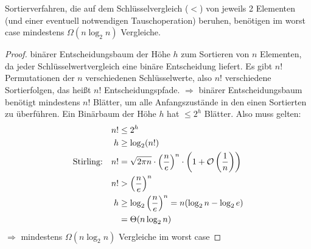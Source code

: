 \begin{proposition}
	Sortierverfahren, die auf dem Schlüsselvergleich ($<$) von jeweils 2 Elementen (und einer eventuell notwendigen Tauschoperation) beruhen, benötigen im worst case mindestens $\Omega(n\log_2 n)$ Vergleiche.
\end{proposition}
\begin{proof}
	binärer Entscheidungsbaum der Höhe $h$ zum Sortieren von $n$ Elementen, da jeder Schlüsselwertvergleich eine binäre Entscheidung liefert. Es gibt $n!$ Permutationen der $n$ verschiedenen Schlüsselwerte, also $n!$ verschiedene Sortierfolgen, das heißt $n!$ Entscheidungspfade. $\Rightarrow$ binärer Entscheidungsbaum benötigt mindestens $n!$ Blätter, um alle Anfangszustände in den einen Sortierten zu überführen. Ein Binärbaum der Höhe $h$ hat $\le 2^h$ Blätter. Also muss gelten:
	\begin{align}
		n! &\le 2^h \notag \\
		h &\ge \log_2(n!) \notag \\
		\text{Stirling:} \quad n! &= \sqrt{2\pi n}\cdot \left(\frac{n}{e}\right)^n\cdot \left(1+\mathcal{O}\left(\frac{1}{n}\right) \right) \notag \\
		n! &> \left(\frac{n}{e}\right)^n \notag \\
		h &\ge \log_2 \left( \frac{n}{e}\right)^n=n(\log_2 n-\log_2 e) \notag \\
		&= \Theta(n\log_2 n) \notag
	\end{align}
	$\Rightarrow$ mindestens $\Omega(n\log_2 n)$ Vergleiche im worst case
\end{proof}